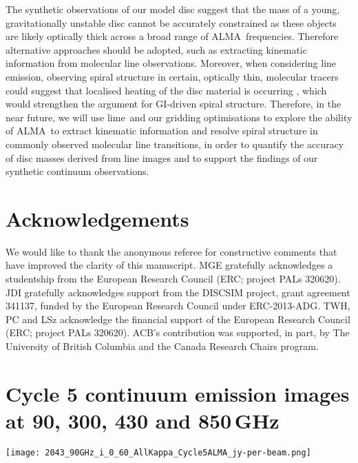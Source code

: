 \documentclass[fleqn,usenatbib]{mnras}
\newcommand{\lime}{{\sc lime}}
\newcommand{\alma}{ALMA}
\begin{document}
The synthetic observations of our model disc suggest that the mass of a young, gravitationally unstable disc cannot be accurately constrained as these objects are likely optically thick across a broad range of \alma\ frequencies. Therefore alternative approaches should be adopted, such as extracting kinematic information from molecular line observations. Moreover, when considering line emission, observing spiral structure in certain, optically thin, molecular tracers could suggest that localised heating of the disc material is occurring , which would strengthen the argument for GI-driven spiral structure. Therefore, in the near future, we will use \lime\ and our gridding optimisations to explore the ability of \alma\ to extract kinematic information and resolve spiral structure in commonly observed molecular line transitions, in order to quantify the accuracy of disc masses derived from line images and to support the findings of our synthetic continuum observations.

\section{Acknowledgements}
\label{sec:acknowledgements}

We would like to thank the anonymous referee for constructive comments that have improved the clarity of this manuscript. MGE gratefully acknowledges a studentship from the European Research Council (ERC; project PALs 320620).  JDI gratefully acknowledges support from the DISCSIM project, grant agreement 341137, funded by the European Research Council under ERC-2013-ADG.  TWH, PC and LSz acknowledge the financial support of the European Research Council (ERC; project PALs 320620).  ACB's contribution was supported, in part, by The University of British Columbia and the Canada Research Chairs program.




\appendix
\section[Cycle5]{Cycle 5 continuum emission images at 90, 300, 430 and 850\,GHz} 
\label{sec:cycle5extra}

\begin{figure*}
    \texttt{[image: 2043\_90GHz\_i\_0\_60\_AllKappa\_Cycle5ALMA\_jy-per-beam.png]}
    \caption{Continuum emission images of our disc model at 90\,GHz for three different dust configurations and two different inclinations, synthesised using the \alma\ Cycle 5 antenna configuration. The white ellipse in the lower left indicates the size of the beam, which is 0.046$\,\times\,$0.044\,arcsec and is constant across all panels. The noise is approximately 11\,\textmu Jy per beam across the parameter space.}
    \label{fig:90GHzCycle5}
\end{figure*}
\end{document}
